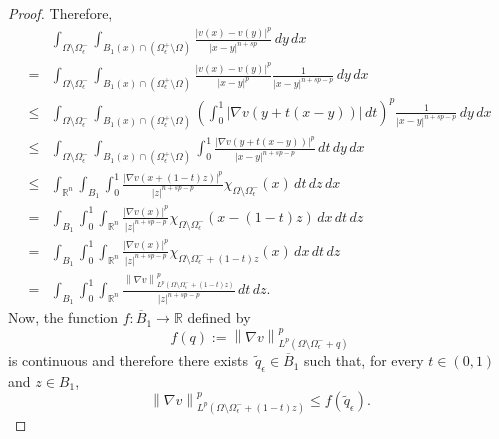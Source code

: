 \documentclass[12pt]{article}
\newcommand{\R}{\mathbb{R}}
\numberwithin{equation}{section}
\renewcommand{\leq}{\leqslant}
\begin{document}
\begin{appendix}
\begin{proof}
Therefore,
\begin{equation}\label{yety}
\begin{split}
&\int_{\Omega\setminus \Omega_{\epsilon}^{-}}\int_{B_1(x)\cap \left(\Omega_{\epsilon}^{+}\setminus \Omega\right)} \frac{\left|v(x)-v(y)\right|^p}{\left|x-y\right|^{n+sp}}\,dy\,dx\\
=&\int_{\Omega\setminus \Omega_{\epsilon}^{-}}\int_{B_1(x)\cap \left(\Omega_{\epsilon}^{+}\setminus \Omega\right)} \frac{\left|v(x)-v(y)\right|^p}{\left|x-y\right|^{p}}\frac{1}{\left|x-y\right|^{n+sp-p}}\,dy\,dx\\
\leq & \int_{\Omega\setminus \Omega_{\epsilon}^{-}}\int_{B_1(x)\cap \left(\Omega_{\epsilon}^{+}\setminus \Omega\right)} \left( \int_{0}^1\left|\nabla v(y+t(x-y))\right|\,dt     \right)^p\frac{1}{\left|x-y\right|^{n+sp-p}}\,dy\,dx\\
\leq &\int_{\Omega\setminus \Omega_{\epsilon}^{-}}\int_{B_1(x)\cap \left(\Omega_{\epsilon}^{+}\setminus \Omega\right)} \int_{0}^1\frac{\left|\nabla v(y+t(x-y))\right|^p}{\left|x-y\right|^{n+sp-p}}\,dt \,dy\,dx\\
\leq & \int_{\R^n}\int_{B_1} \int_{0}^1\frac{\left|\nabla v(x+(1-t)z)\right|^p}{\left|z\right|^{n+sp-p}}\chi_{\Omega\setminus \Omega_{\epsilon}^{-}}(x)\,dt \,dz\,dx\\
=&\int_{B_1} \int_{0}^1\int_{\R^n}\frac{\left|\nabla v(x)\right|^p}{\left|z\right|^{n+sp-p}}\chi_{\Omega\setminus \Omega_{\epsilon}^{-}}(x-(1-t)z)\,dx\,dt \,dz\\
=&\int_{B_1} \int_{0}^1\int_{\R^n}\frac{\left|\nabla v(x)\right|^p}{\left|z\right|^{n+sp-p}}\chi_{\Omega\setminus \Omega_{\epsilon}^{-}+(1-t)z}(x)\,dx\,dt \,dz\\
=&\int_{B_1} \int_{0}^1\int_{\R^n}\frac{\left\|\nabla v\right\|_{L^p(\Omega\setminus \Omega_{\epsilon}^{-}+(1-t)z)}^p}{\left|z\right|^{n+sp-p}}\,dt \,dz.
\end{split}
\end{equation}
Now, the function $f:\overline{B}_1\to \R$ defined by
$$f(q):=\left\|\nabla v\right\|_{L^p(\Omega\setminus \Omega_{\epsilon}^{-}+q)}^p$$
is continuous and therefore there exists~$\tilde{q}_\epsilon\in \overline{B}_1$ such that, for every $t\in (0,1)$ and $z\in B_1$,
\begin{equation*}
\left\|\nabla v \right\|_{L^p(\Omega\setminus \Omega_{\epsilon}^{-}+(1-t)z)}^p\leq f(\tilde{q}_\epsilon).
\end{equation*}


\end{proof}
\end{appendix}
\end{document}
